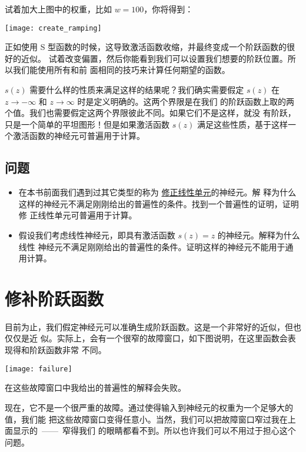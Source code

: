 试着加大上图中的权重，比如 $w = 100$，你将得到：
\begin{center}
  \texttt{[image: create\_ramping]}
\end{center}

正如使用 S 型函数的时候，这导致激活函数收缩，并最终变成一个阶跃函数的很好的近似。
试着改变偏置，然后你能看到我们可以设置我们想要的阶跃位置。所以我们能使用所有和前
面相同的技巧来计算任何期望的函数。

$s(z)$ 需要什么样的性质来满足这样的结果呢？我们确实需要假定 $s(z)$ 在 $z
\rightarrow -\infty$ 和 $z \rightarrow \infty$ 时是定义明确的。这两个界限是在我们
的阶跃函数上取的两个值。我们也需要假定这两个界限彼此不同。如果它们不是这样，就没
有阶跃，只是一个简单的平坦图形！但是如果激活函数 $s(z)$ 满足这些性质，基于这样一
个激活函数的神经元可普遍用于计算。

\subsection*{问题}

\begin{itemize}
\item 在本书前面我们遇到过其它类型的称为
  \hyperref[subsec:other_models_of_artificial_neuron]{修正线性单元}的神经元。解
  释为什么这样的神经元不满足刚刚给出的普遍性的条件。找到一个普遍性的证明，证明修
  正线性单元可普遍用于计算。
\item 假设我们考虑线性神经元，即具有激活函数 $s(z) = z$ 的神经元。解释为什么线性
  神经元不满足刚刚给出的普遍性的条件。证明这样的神经元不能用于通用计算。
\end{itemize}

\section{修补阶跃函数}
\label{sec:fixing_up_the_step_functions}

目前为止，我们假定神经元可以准确生成阶跃函数。这是一个非常好的近似，但也仅仅是近
似。实际上，会有一个很窄的故障窗口，如下图说明，在这里函数会表现得和阶跃函数非常
不同。
\begin{center}
  \texttt{[image: failure]}
\end{center}

在这些故障窗口中我给出的普遍性的解释会失败。

现在，它不是一个很严重的故障。通过使得输入到神经元的权重为一个足够大的值，我们能
把这些故障窗口变得任意小。当然，我们可以把故障窗口窄过我在上面显示的~——~窄得我们
的眼睛都看不到。所以也许我们可以不用过于担心这个问题。

